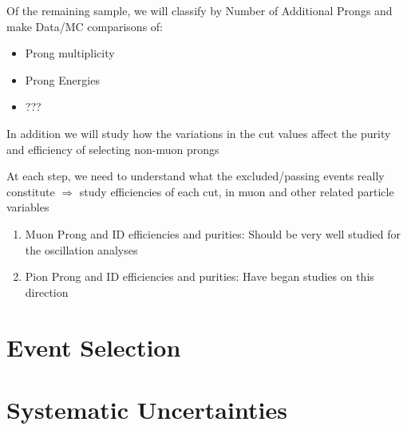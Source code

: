\documentclass[11pt]{article}
\begin{document}



\noindent Of the remaining sample, we will classify by Number of Additional Prongs and make Data/MC comparisons of:
\begin{itemize}
	\item Prong multiplicity
    \item Prong Energies
    \item ???
\end{itemize}

\noindent In addition we will study how the variations in the cut values affect the purity and efficiency of selecting non-muon prongs


At each step, we need to understand what the excluded/passing events really constitute $\Rightarrow$ study efficiencies of each cut, in muon and other related particle variables
\begin{enumerate}
	\item Muon Prong and ID efficiencies and purities: Should be very well studied for the oscillation analyses
    \item Pion Prong and ID efficiencies and purities: Have began studies on this direction
\end{enumerate}


\section{Event Selection}


\section{Systematic Uncertainties}

\end{document}
